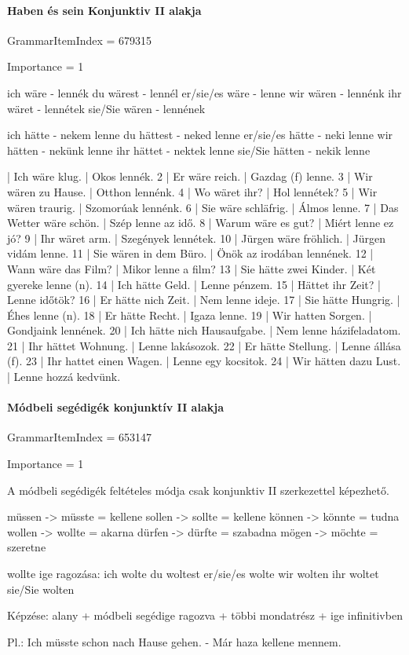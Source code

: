 \documentclass{article}
\newenvironment{desc}{\verbatim}{\endverbatim}
\newenvironment{exmp}{\verbatim}{\endverbatim}
\begin{document}
\paragraph{Haben és sein Konjunktiv II alakja}

GrammarItemIndex = 679315

Importance = 1

\begin{desc}
ich wäre - lennék
du wärest - lennél
er/sie/es wäre - lenne
wir wären - lennénk
ihr wäret - lennétek
sie/Sie wären - lennének

ich hätte - nekem lenne
du hättest - neked lenne
er/sie/es hätte - neki lenne
wir hätten - nekünk lenne
ihr hättet - nektek lenne
sie/Sie hätten - nekik lenne
\end{desc}

\begin{exmp}
1 | Ich wäre klug. | Okos lennék.
2 | Er wäre reich. | Gazdag (f) lenne.
3 | Wir wären zu Hause. | Otthon lennénk.
4 | Wo wäret ihr? | Hol lennétek?
5 | Wir wären traurig. | Szomorúak lennénk.
6 | Sie wäre schläfrig. | Álmos lenne.
7 | Das Wetter wäre schön. | Szép lenne az idő.
8 | Warum wäre es gut? | Miért lenne ez jó?
9 | Ihr wäret arm. | Szegények lennétek.
10 | Jürgen wäre fröhlich. | Jürgen vidám lenne.
11 | Sie wären in dem Büro. | Önök az irodában lennének.
12 | Wann wäre das Film? | Mikor lenne a film?
13 | Sie hätte zwei Kinder. | Két gyereke lenne (n).
14 | Ich hätte Geld. | Lenne pénzem.
15 | Hättet ihr Zeit? | Lenne időtök?
16 | Er hätte nich Zeit. | Nem lenne ideje.
17 | Sie hätte Hungrig. | Éhes lenne (n).
18 | Er hätte Recht. | Igaza lenne.
19 | Wir hatten Sorgen. | Gondjaink lennének.
20 | Ich hätte nich Hausaufgabe. | Nem lenne házifeladatom.
21 | Ihr hättet Wohnung. | Lenne lakásozok.
22 | Er hätte Stellung. | Lenne állása (f).
23 | Ihr hattet einen Wagen. | Lenne egy kocsitok.
24 | Wir hätten dazu Lust. | Lenne hozzá kedvünk.
\end{exmp}

\paragraph{Módbeli segédigék konjunktív II alakja}

GrammarItemIndex = 653147

Importance = 1

\begin{desc}
A módbeli segédigék feltételes módja csak konjunktiv II szerkezettel képezhető.

müssen -> müsste = kellene
sollen -> sollte = kellene
können -> könnte = tudna
wollen -> wollte = akarna
dürfen -> dürfte = szabadna
mögen -> möchte = szeretne

wollte ige ragozása:
ich wolte
du woltest
er/sie/es wolte
wir wolten
ihr woltet
sie/Sie wolten

Képzése: alany + módbeli segédige ragozva + többi mondatrész + ige infinitivben

Pl.: Ich müsste schon nach Hause gehen. - Már haza kellene mennem.
\end{desc}
\end{document}
